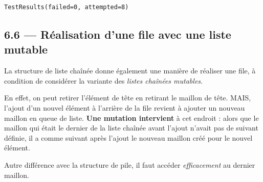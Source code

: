 \documentclass[a4paper,17pt]{extarticle}
\makeatletter
\newcommand{\boxspacing}{\kern\kvtcb@left@rule\kern\kvtcb@boxsep}
\newcommand{\prompt}[4]{
        \ttfamily\llap{{\color{#2}[#3]:\hspace{3pt}#4}}\vspace{-\baselineskip}
    }
\makeatother
\begin{document}
            \begin{tcolorbox}[breakable, size=fbox, boxrule=.5pt, pad at break*=1mm, opacityfill=0]
\prompt{Out}{outcolor}{5}{\boxspacing}
\begin{Verbatim}[commandchars=\\\{\}]
TestResults(failed=0, attempted=8)
\end{Verbatim}
\end{tcolorbox}
        
    \hypertarget{ruxe9alisation-dune-file-avec-une-liste-mutable}{%
\subsection{6.6 --- Réalisation d'une file avec une liste
mutable}\label{ruxe9alisation-dune-file-avec-une-liste-mutable}}

    La structure de liste chaînée donne également une manière de réaliser
une file, à condition de considérer la variante des \emph{listes
chaînées mutables}.

En effet, on peut retirer l'élément de tête en retirant le maillon de
tête. MAIS, l'ajout d'un nouvel élément à l'arrière de la file revient à
ajouter un nouveau maillon en queue de liste. \textbf{Une mutation
intervient} à cet endroit : alors que le maillon qui était le dernier de
la liste chaînée avant l'ajout n'avait pas de suivant définie, il a
comme suivant après l'ajout le nouveau maillon créé pour le nouvel
élément.

    Autre différence avec la structure de pile, il faut accéder
\emph{efficacement} au dernier maillon.
\end{document}
